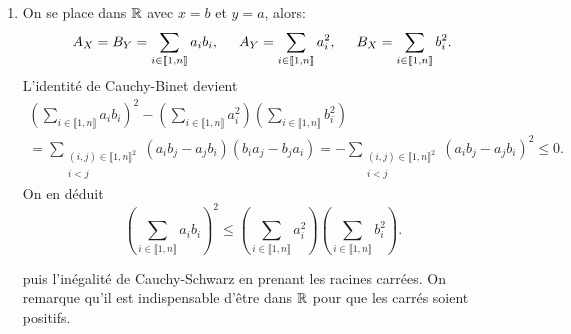 \begin{enumerate}
 \item On se place dans $\mathbb{R}$ avec $x=b$ et $y=a$, alors:
\[
 A_X = B_Y = \sum_{i\in \llbracket 1,n \rrbracket}a_ib_i,\hspace{0.5cm} A_Y = \sum_{i \in \llbracket 1,n \rrbracket}a_i^2
 , \hspace{0.5cm} B_X = \sum_{i \in \llbracket 1,n \rrbracket}b_i^2.
\]
L'identité de Cauchy-Binet devient
\begin{multline*}
\left( \sum_{i\in \llbracket 1,n \rrbracket}a_ib_i\right)^2 
 - \left( \sum_{i \in \llbracket 1,n \rrbracket}a_i^2\right) \left( \sum_{i \in \llbracket 1,n \rrbracket}b_i^2\right)\\
 = \sum_{\substack{(i,j)\in \llbracket 1,n\rrbracket^2 \\ i < j}} (a_ib_j - a_jb_i) (b_i a_j - b_j a_i)
 = - \sum_{\substack{(i,j)\in \llbracket 1,n\rrbracket^2 \\ i < j}} (a_ib_j - a_jb_i)^2 \leq 0.
\end{multline*}
On en déduit 
\[
\left( \sum_{i\in \llbracket 1,n \rrbracket}a_ib_i\right)^2 
 \leq \left( \sum_{i \in \llbracket 1,n \rrbracket}a_i^2\right) \left( \sum_{i \in \llbracket 1,n \rrbracket}b_i^2\right). 
\]

puis l'inégalité de Cauchy-Schwarz en prenant les racines carrées. On remarque qu'il est indispensable d'être dans $\mathbb{R}$ pour que les carrés soient positifs.


\end{enumerate}
